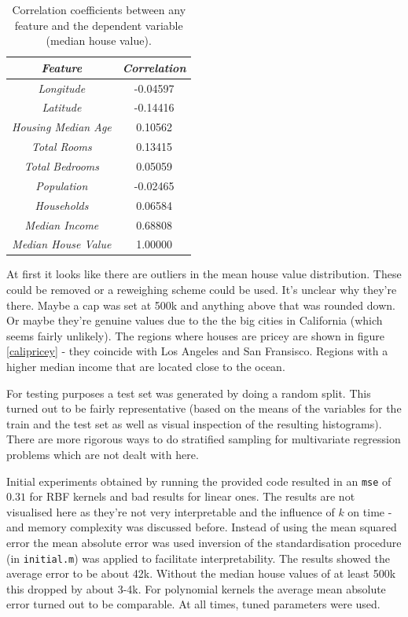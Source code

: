 \begingroup
\begin{table}
\centering
\begin{tabular}{c|c}
\textit{Feature} & \textit{Correlation}\\\hline
\textit{Longitude} & -0.04597\\
\textit{Latitude} & -0.14416\\
\textit{Housing Median Age} & 0.10562\\
\textit{Total Rooms} & 0.13415\\
\textit{Total Bedrooms} & 0.05059\\
\textit{Population} & -0.02465\\
\textit{Households} & 0.06584\\
\textit{Median Income} & 0.68808\\
\textit{Median House Value} & 1.00000
\end{tabular}
\caption{Correlation coefficients between any feature and the dependent variable (median house value).}
\label{calicorrcoef}
\end{table}

\par At first it looks like there are outliers in the mean house value distribution. These could be removed or a reweighing scheme could be used. It's unclear why they're there. Maybe a cap was set at 500k and anything above that was rounded down. Or maybe they're genuine values due to the the big cities in California (which seems fairly unlikely). The regions where houses are pricey are shown in figure \ref{calipricey} - they coincide with Los Angeles and San Fransisco. Regions with a higher median income that are located close to the ocean.

\par For testing purposes a test set was generated by doing a random split. This turned out to be fairly representative (based on the means of the variables for the train and the test set as well as visual inspection of the resulting histograms). There are more rigorous ways to do stratified sampling for multivariate regression problems which are not dealt with here.

\endgroup

\par Initial experiments obtained by running the provided code resulted in an \texttt{mse} of $0.31$ for RBF kernels and bad results for linear ones. The results are not visualised here as they're not very interpretable and the influence of $k$ on time - and memory complexity was discussed before. Instead of using the mean squared error the mean absolute error was used inversion of the standardisation procedure (in \texttt{initial.m}) was applied to facilitate interpretability. The results showed the average error to be about 42k. Without the median house values of at least 500k this dropped by about 3-4k. For polynomial kernels the average mean absolute error turned out to be comparable. At all times, tuned parameters were used.

